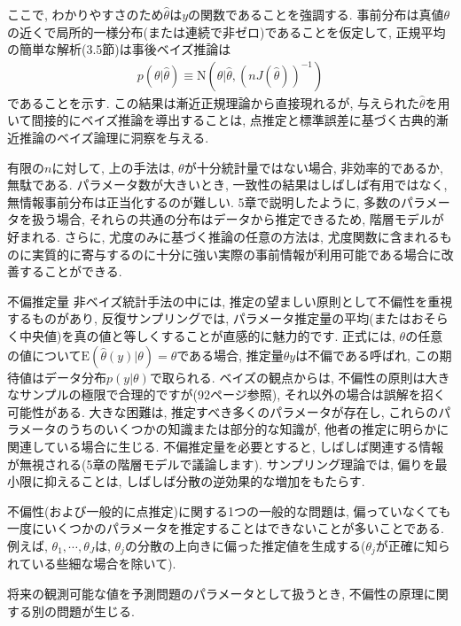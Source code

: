\documentclass[10pt,dvipdfmx,a4]{beamer}
\newcommand{\eqn}[1]{\begin{align*}#1\end{align*}}
\begin{document}
\begin{frame}
ここで, わかりやすさのため$\hat{\theta}$は$y$の関数であることを強調する.
事前分布は真値$\theta$の近くで局所的一様分布(または連続で非ゼロ)であることを仮定して, 正規平均の簡単な解析(3.5節)は事後ベイズ推論は
\eqn{p(\theta|\hat{\theta})\equiv \text{N}(\theta|\hat{\theta}, (nJ(\hat{\theta}))^{-1})}
であることを示す.
この結果は漸近正規理論から直接現れるが, 与えられた$\hat{\theta}$を用いて間接的にベイズ推論を導出することは, 点推定と標準誤差に基づく古典的漸近推論のベイズ論理に洞察を与える.

有限の$n$に対して, 上の手法は, $\theta$が十分統計量ではない場合, 非効率的であるか, 無駄である.
パラメータ数が大きいとき, 一致性の結果はしばしば有用ではなく, 無情報事前分布は正当化するのが難しい.
5章で説明したように, 多数のパラメータを扱う場合, それらの共通の分布はデータから推定できるため, 階層モデルが好まれる.
さらに, 尤度のみに基づく推論の任意の方法は, 尤度関数に含まれるものに実質的に寄与するのに十分に強い実際の事前情報が利用可能である場合に改善することができる.
\end{frame}


\begin{frame}{不偏推定量}
非ベイズ統計手法の中には, 推定の望ましい原則として不偏性を重視するものがあり, 反復サンプリングでは, パラメータ推定量の平均(またはおそらく中央値)を真の値と等しくすることが直感的に魅力的です.
正式には, $\theta$の任意の値について$\text{E}(\hat{\theta}(y)|\theta)=\theta$である場合, 推定量$\theta y$は不偏である呼ばれ, この期待値はデータ分布$p(y|\theta)$で取られる.
ベイズの観点からは, 不偏性の原則は大きなサンプルの極限で合理的ですが(92ページ参照), それ以外の場合は誤解を招く可能性がある.
大きな困難は, 推定すべき多くのパラメータが存在し, これらのパラメータのうちのいくつかの知識または部分的な知識が, 他者の推定に明らかに関連している場合に生じる.
不偏推定量を必要とすると, しばしば関連する情報が無視される(5章の階層モデルで議論します).
サンプリング理論では, 偏りを最小限に抑えることは, しばしば分散の逆効果的な増加をもたらす.

不偏性(および一般的に点推定)に関する1つの一般的な問題は, 偏っていなくても一度にいくつかのパラメータを推定することはできないことが多いことである.
例えば, $\theta_1, \cdots,\theta_J$は, $\theta_j$の分散の上向きに偏った推定値を生成する($\theta_j$が正確に知られている些細な場合を除いて).

将来の観測可能な値を予測問題のパラメータとして扱うとき, 不偏性の原理に関する別の問題が生じる.
\end{frame}
\end{document}
